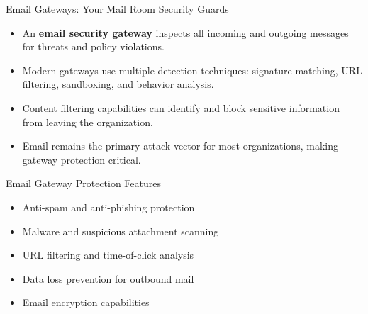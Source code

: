 \documentclass{beamer}
\begin{document}
\begin{frame}{Email Gateways: Your Mail Room Security Guards}
\begin{itemize}
\item An \textbf{email security gateway} inspects all incoming and outgoing messages for threats and policy violations.
\item Modern gateways use multiple detection techniques: signature matching, URL filtering, sandboxing, and behavior analysis.
\item Content filtering capabilities can identify and block sensitive information from leaving the organization.
\item Email remains the primary attack vector for most organizations, making gateway protection critical.
\end{itemize}

\begin{exampleblock}{Email Gateway Protection Features}
\begin{itemize}
\item Anti-spam and anti-phishing protection
\item Malware and suspicious attachment scanning
\item URL filtering and time-of-click analysis
\item Data loss prevention for outbound mail
\item Email encryption capabilities
\end{itemize}
\end{exampleblock}
\end{frame}
\end{document}
